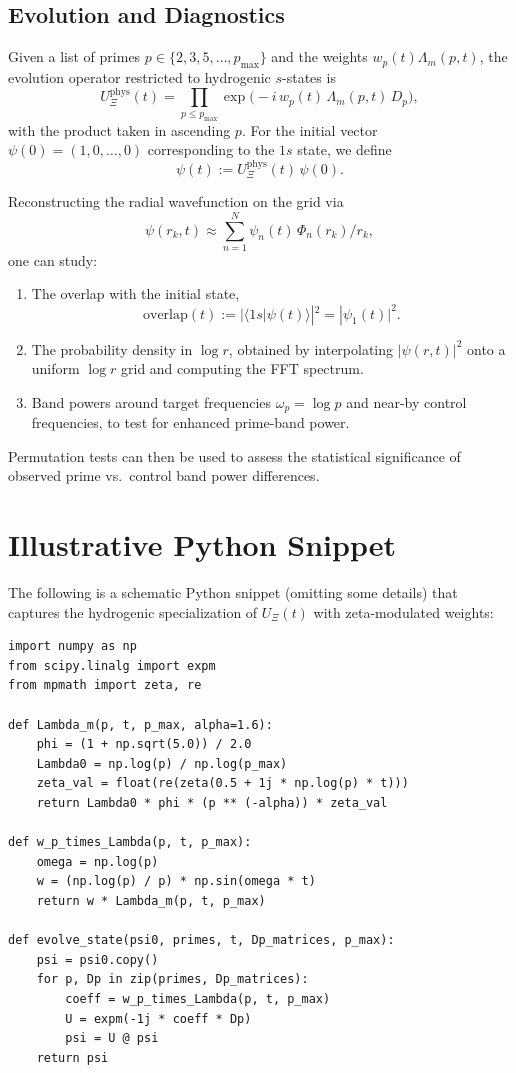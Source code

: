 \documentclass[11pt]{article}
\begin{document}
\subsection{Evolution and Diagnostics}

Given a list of primes $p \in \{2,3,5,\dots,p_{\max}\}$ and the
weights $w_p(t)\Lambda_m(p,t)$, the evolution operator restricted to
hydrogenic $s$-states is
\[
  U_{\Xi}^{\text{phys}}(t)
    = \prod_{p\le p_{\max}} \exp\bigl(-i\,w_p(t)\,\Lambda_m(p,t)\, D_p\bigr),
\]
with the product taken in ascending $p$. For the initial vector
$\psi(0) = (1,0,\dots,0)$ corresponding to the $1s$ state, we define
\[
  \psi(t) := U_{\Xi}^{\text{phys}}(t)\,\psi(0).
\]

Reconstructing the radial wavefunction on the grid via
\[
  \psi(r_k,t) \approx \sum_{n=1}^{N} \psi_n(t)\,\Phi_n(r_k)/r_k,
\]
one can study:
\begin{enumerate}[label=\textbf{(\alph*)}]
  \item The overlap with the initial state,
  \[
    \text{overlap}(t)
      := |\langle 1s | \psi(t)\rangle|^2
      = |\psi_1(t)|^2.
  \]
  \item The probability density in $\log r$, obtained by interpolating
  $|\psi(r,t)|^2$ onto a uniform $\log r$ grid and computing the FFT
  spectrum.

  \item Band powers around target frequencies $\omega_p = \log p$ and
  near-by control frequencies, to test for enhanced prime-band power.
\end{enumerate}

Permutation tests can then be used to assess the statistical
significance of observed prime vs.\ control band power differences.

\section{Illustrative Python Snippet}

The following is a schematic Python snippet (omitting some details)
that captures the hydrogenic specialization of $U_\Xi(t)$ with
zeta-modulated weights:
\begin{verbatim}
import numpy as np
from scipy.linalg import expm
from mpmath import zeta, re

def Lambda_m(p, t, p_max, alpha=1.6):
    phi = (1 + np.sqrt(5.0)) / 2.0
    Lambda0 = np.log(p) / np.log(p_max)
    zeta_val = float(re(zeta(0.5 + 1j * np.log(p) * t)))
    return Lambda0 * phi * (p ** (-alpha)) * zeta_val

def w_p_times_Lambda(p, t, p_max):
    omega = np.log(p)
    w = (np.log(p) / p) * np.sin(omega * t)
    return w * Lambda_m(p, t, p_max)

def evolve_state(psi0, primes, t, Dp_matrices, p_max):
    psi = psi0.copy()
    for p, Dp in zip(primes, Dp_matrices):
        coeff = w_p_times_Lambda(p, t, p_max)
        U = expm(-1j * coeff * Dp)
        psi = U @ psi
    return psi
\end{verbatim}
\end{document}

